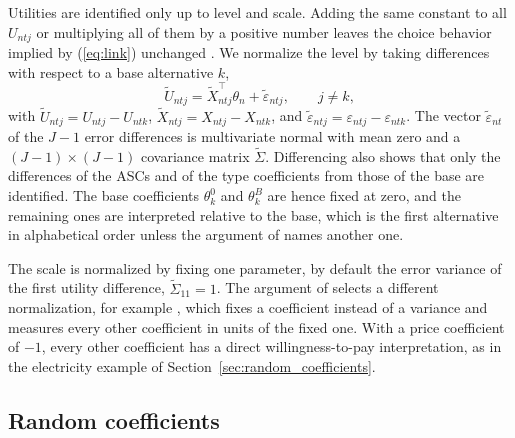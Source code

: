 \documentclass[article,shortnames]{jss}
\newcommand{\fct}[1]{\code{#1()}}
\begin{document}
Utilities are identified only up to level and scale. Adding the same constant to
all $U_{ntj}$ or multiplying all of them by a positive number leaves the choice
behavior implied by (\ref{eq:link}) unchanged
\citep[Chapter~2]{Train2009}. We normalize the level by taking differences with
respect to a base alternative $k$,
%
\begin{equation}
  \label{eq:utility_diff}
  \tilde{U}_{ntj} = \tilde{X}_{ntj}^\top \theta_n + \tilde{\varepsilon}_{ntj},
  \qquad j \neq k,
\end{equation}
%
with $\tilde{U}_{ntj} = U_{ntj} - U_{ntk}$, $\tilde{X}_{ntj} = X_{ntj} -
X_{ntk}$, and $\tilde{\varepsilon}_{ntj} = \varepsilon_{ntj} -
\varepsilon_{ntk}$. The vector $\tilde{\varepsilon}_{nt}$ of the $J - 1$ error
differences is multivariate normal with mean zero and a $(J - 1) \times (J - 1)$
covariance matrix $\tilde{\Sigma}$. Differencing also shows that only the
differences of the ASCs and of the type  coefficients from those of the
base are identified. The base coefficients $\theta_{k}^{0}$ and $\theta_{k}^{B}$
are hence fixed at zero, and the remaining ones are interpreted relative to the
base, which is the first alternative in alphabetical order unless the argument
 of \fct{fit} names another one.

The scale is normalized by fixing one parameter, by default the error variance
of the first utility difference, $\tilde{\Sigma}_{11} = 1$. The argument
 of \fct{fit} selects a different normalization, for example
, which fixes a coefficient instead of a variance
and measures every other coefficient in units of the fixed one. With a price
coefficient of $-1$, every other coefficient has a direct willingness-to-pay
interpretation, as in the electricity example of
Section~\ref{sec:random_coefficients}.

\subsection{Random coefficients} \label{sec:model:random}
\end{document}
